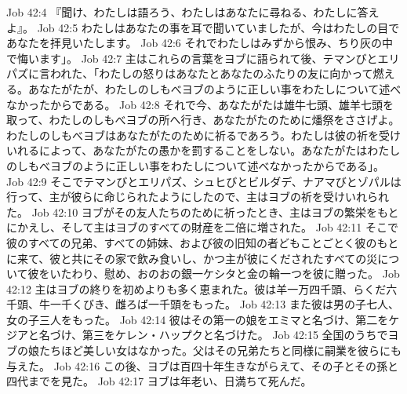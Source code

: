 Job 42:4  『聞け、わたしは語ろう、わたしはあなたに尋ねる、わたしに答えよ』。
Job 42:5  わたしはあなたの事を耳で聞いていましたが、今はわたしの目であなたを拝見いたします。
Job 42:6  それでわたしはみずから恨み、ちり灰の中で悔います」。
Job 42:7  主はこれらの言葉をヨブに語られて後、テマンびとエリパズに言われた、「わたしの怒りはあなたとあなたのふたりの友に向かって燃える。あなたがたが、わたしのしもべヨブのように正しい事をわたしについて述べなかったからである。
Job 42:8  それで今、あなたがたは雄牛七頭、雄羊七頭を取って、わたしのしもべヨブの所へ行き、あなたがたのために燔祭をささげよ。わたしのしもべヨブはあなたがたのために祈るであろう。わたしは彼の祈を受けいれるによって、あなたがたの愚かを罰することをしない。あなたがたはわたしのしもべヨブのように正しい事をわたしについて述べなかったからである」。
Job 42:9  そこでテマンびとエリパズ、シュヒびとビルダデ、ナアマびとゾパルは行って、主が彼らに命じられたようにしたので、主はヨブの祈を受けいれられた。
Job 42:10  ヨブがその友人たちのために祈ったとき、主はヨブの繁栄をもとにかえし、そして主はヨブのすべての財産を二倍に増された。
Job 42:11  そこで彼のすべての兄弟、すべての姉妹、および彼の旧知の者どもことごとく彼のもとに来て、彼と共にその家で飲み食いし、かつ主が彼にくだされたすべての災について彼をいたわり、慰め、おのおの銀一ケシタと金の輪一つを彼に贈った。
Job 42:12  主はヨブの終りを初めよりも多く恵まれた。彼は羊一万四千頭、らくだ六千頭、牛一千くびき、雌ろば一千頭をもった。
Job 42:13  また彼は男の子七人、女の子三人をもった。
Job 42:14  彼はその第一の娘をエミマと名づけ、第二をケジアと名づけ、第三をケレン・ハップクと名づけた。
Job 42:15  全国のうちでヨブの娘たちほど美しい女はなかった。父はその兄弟たちと同様に嗣業を彼らにも与えた。
Job 42:16  この後、ヨブは百四十年生きながらえて、その子とその孫と四代までを見た。
Job 42:17  ヨブは年老い、日満ちて死んだ。


